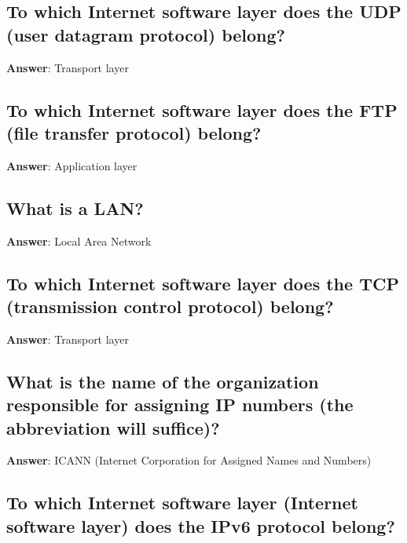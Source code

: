 \documentclass[a4paper,11pt,oneside]{article}
\begin{document}
\begin{sloppypar}
\subsection{To which Internet software layer does the UDP (user datagram protocol) belong?}

\label{q:19:sa:en:True}

\textbf{Answer}: Transport layer



\subsection{To which Internet software layer does the FTP (file transfer protocol) belong?}

\label{q:20:sa:en:True}

\textbf{Answer}: Application layer



\subsection{What is a LAN?}

\label{q:21:sa:en:True}

\textbf{Answer}: Local Area Network



\subsection{To which Internet software layer does the TCP (transmission control protocol) belong?}

\label{q:22:sa:en:True}

\textbf{Answer}: Transport layer



\subsection{What is the name of the organization responsible for assigning IP numbers (the abbreviation will suffice)?}

\label{q:23:sa:en:True}

\textbf{Answer}: ICANN (Internet Corporation for Assigned Names and Numbers)



\subsection{To which Internet software layer (Internet software layer) does the IPv6 protocol belong?}


\end{sloppypar}
\end{document}
